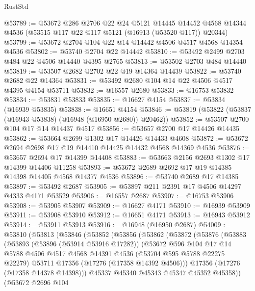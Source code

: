 \begin{lexlean}{RustStd}
\begin{coremodule}
@53789 := @53672
    @286
    @2706
    @22
    @24
    @5121
    @14445
    @14452
    @4568
    @14344
    @4536
    (@53515 @117 @22 @117 @5121 (@16913 (@53520 @117)) @20344)
@53799 := @53672 @2704 @104 @22 @14 @14442 @4506 @4517 @4568 @14354 @4536
@53802 := @53740 @2704 @22 @14442
@53810 := @53492 @2499 @2703 @484 @22 @4506 @14440 @4395 @2765
@53813 := @53502 @2703 @484 @14440
@53819 := @53507 @2682 @2702 @22 @19 @14364 @14439
@53822 := @53740 @2682 @22 @14364
@53831 := @53492 @2680 @104 @14 @22 @4506 @4517 @4395 @4154 @53711
@53832 := @16557 @2680
@53833 := @16753 @53832
@53834 := @53831 @53833
@53835 := @16627 @4154
@53837 := @53834 (@16939 @53835)
@53838 := @16651 @4154
@53846 := @53819 (@53822 (@53837 (@16943 @53838) (@16948 (@16950 @2680)) @20462))
@53852 := @53507 @2700 @104 @17 @14 @14437 @4517
@53856 := @53657 @2700 @17 @14426 @14435
@53862 := @53664 @2699 @1302 @17 @14426 @14433 @4608
@53872 := @53672 @2694 @2698 @17 @19 @14410 @14425 @14432 @4568 @14369 @4536
@53876 := @53657 @2694 @17 @14399 @14408
@53883 := @53663 @2156 @2693 @1302 @17 @14399 @14406 @11258
@53893 := @53672 @2689 @2692 @17 @19 @14385 @14398 @14405 @4568 @14377 @4536
@53896 := @53740 @2689 @17 @14385
@53897 := @53492 @2687
@53905 := @53897 @211 @2391 @17 @4506 @14297 @4333 @4171 @53529
@53906 := @16557 @2687
@53907 := @16753 @53906
@53908 := @53905 @53907
@53909 := @16627 @4171
@53910 := @16939 @53909
@53911 := @53908 @53910
@53912 := @16651 @4171
@53913 := @16943 @53912
@53914 := @53911 @53913
@53916 := @16948 (@16950 @2687)
@54009 := @53810
    (@53813
      (@53846
        (@53852
          (@53856
            (@53862
              (@53872
                (@53876
                  (@53883
                    (@53893
                      (@53896 (@53914 @53916 @17282))
                      (@53672
                        @596
                        @104
                        @17
                        @14
                        @5788
                        @4506
                        @4517
                        @4568
                        @14391
                        @4536
                        (@53704 @595 @5788 @22275 @22279)
                        @53711
                        @17356
                        (@17276 (@17358 @14392 @4506)))
                      @17356
                      (@17276 (@17358 @14378 @14398)))
                    @45337
                    @45340
                    @45343
                    @45347
                    @45352
                    @45358))
                (@53672
                  @2696
                  @104

\end{coremodule}
\end{lexlean}
